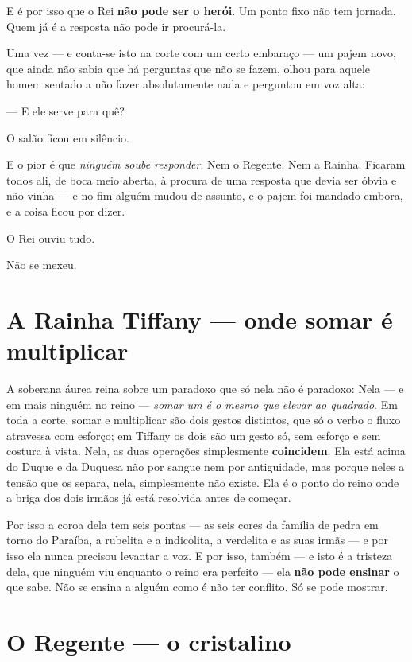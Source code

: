 \documentclass[livro.tex]{subfiles}
\begin{document}
E é por isso que o Rei \textbf{não pode ser o herói}. Um ponto fixo não tem jornada. Quem já é a resposta não pode
ir procurá-la.

\medskip

Uma vez --- e conta-se isto na corte com um certo embaraço --- um pajem novo, que ainda não sabia que há perguntas
que não se fazem, olhou para aquele homem sentado a não fazer absolutamente nada e perguntou em voz alta:

--- E ele serve para quê?

O salão ficou em silêncio.

E o pior é que \emph{ninguém soube responder}. Nem o Regente. Nem a Rainha. Ficaram todos ali, de boca meio aberta,
à procura de uma resposta que devia ser óbvia e não vinha --- e no fim alguém mudou de assunto, e o pajem foi
mandado embora, e a coisa ficou por dizer.

O Rei ouviu tudo.

Não se mexeu.

\section*{A Rainha Tiffany --- onde somar é multiplicar}

A soberana áurea reina sobre um paradoxo que só nela não é paradoxo:
Nela --- e em mais ninguém no reino --- \emph{somar um é o mesmo que elevar ao
quadrado}. Em toda a corte, somar e multiplicar são dois gestos distintos, que só o
verbo o fluxo atravessa com esforço; em Tiffany os dois são um gesto só, sem esforço e
sem costura à vista. Nela, as duas operações simplesmente \textbf{coincidem}. Ela está acima do
Duque e da Duquesa não por sangue nem por antiguidade, mas porque neles a tensão que os
separa, nela, simplesmente não existe. Ela é o ponto do reino onde a briga dos dois irmãos já está resolvida antes
de começar.

Por isso a coroa dela tem seis pontas --- as seis cores da família de pedra em torno do Paraíba, a
rubelita e a indicolita, a verdelita e as suas irmãs --- e por isso ela nunca precisou levantar a voz. E por isso, também --- e isto
é a tristeza dela, que ninguém viu enquanto o reino era perfeito --- ela \textbf{não pode ensinar} o que sabe. Não
se ensina a alguém como é não ter conflito. Só se pode mostrar.

\section*{O Regente --- o cristalino}
\end{document}
